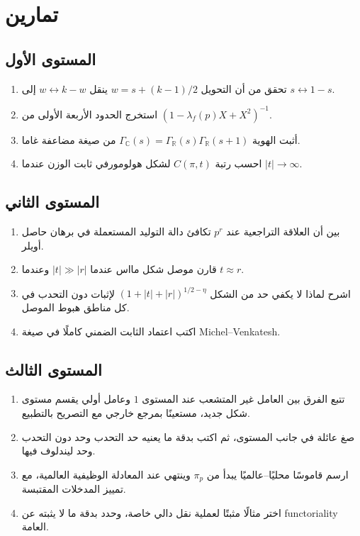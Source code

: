 \section{تمارين}

\subsection{المستوى الأول}
\begin{enumerate}
  \item تحقق من أن التحويل \(w=s+(k-1)/2\) ينقل \(w\leftrightarrow k-w\)
  إلى \(s\leftrightarrow1-s\).
  \item استخرج الحدود الأربعة الأولى من
  \((1-\lambda_f(p)X+X^2)^{-1}\).
  \item أثبت الهوية
  \(\Gamma_{\mathbb C}(s)=\Gamma_{\mathbb R}(s)
  \Gamma_{\mathbb R}(s+1)\) من صيغة مضاعفة غاما.
  \item احسب رتبة \(C(\pi,t)\) لشكل هولومورفي ثابت الوزن عندما
  \(|t|\to\infty\).
\end{enumerate}

\subsection{المستوى الثاني}
\begin{enumerate}
  \item بين أن العلاقة التراجعية عند \(p^r\) تكافئ دالة التوليد
  المستعملة في برهان حاصل أويلر.
  \item قارن موصل شكل مااس عندما \(|t|\gg|r|\) وعندما \(t\approx r\).
  \item اشرح لماذا لا يكفي حد من الشكل
  \((1+|t|+|r|)^{1/2-\eta}\) لإثبات دون التحدب في كل مناطق هبوط
  الموصل.
  \item اكتب اعتماد الثابت الضمني كاملًا في صيغة Michel--Venkatesh.
\end{enumerate}

\subsection{المستوى الثالث}
\begin{enumerate}
  \item تتبع الفرق بين العامل غير المتشعب عند المستوى \(1\) وعامل أولي
  يقسم مستوى شكل جديد، مستعينًا بمرجع خارجي مع التصريح بالتطبيع.
  \item صغ عائلة في جانب المستوى، ثم اكتب بدقة ما يعنيه حد التحدب وحد
  دون التحدب وحد ليندلوف فيها.
  \item ارسم قاموسًا محليًا--عالميًا يبدأ من \(\pi_p\) وينتهي عند
  المعادلة الوظيفية العالمية، مع تمييز المدخلات المقتبسة.
  \item اختر مثالًا مثبتًا لعملية نقل دالي خاصة، وحدد بدقة ما لا يثبته
  عن \textenglish{functoriality} العامة.
\end{enumerate}

